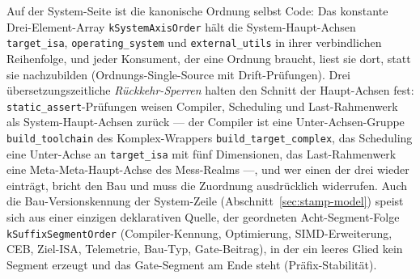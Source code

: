 \begin{nurkurz}
Auf der System-Seite ist die kanonische Ordnung selbst Code: Das konstante Drei-Element-Array
\texttt{kSystemAxisOrder} hält die System-Haupt-Achsen \texttt{target\_isa}, \texttt{operating\_system} und
\texttt{external\_utils} in ihrer verbindlichen Reihenfolge, und jeder Konsument, der eine Ordnung braucht,
liest sie dort, statt sie nachzubilden (Ordnungs-Single-Source mit Drift-Prüfungen). Drei
übersetzungszeitliche \emph{Rückkehr-Sperren} halten den Schnitt der Haupt-Achsen fest:
\texttt{static\_assert}-Prüfungen weisen Compiler, Scheduling und Last-Rahmenwerk als System-Haupt-Achsen
zurück --- der Compiler ist eine Unter-Achsen-Gruppe \texttt{build\_toolchain} des Komplex-Wrappers
\texttt{build\_target\_complex}, das Scheduling eine Unter-Achse an \texttt{target\_isa} mit fünf
Dimensionen, das Last-Rahmenwerk eine Meta-Meta-Haupt-Achse des Mess-Realms ---, und wer einen der drei
wieder einträgt, bricht den Bau und muss die Zuordnung ausdrücklich widerrufen. Auch die
Bau-Versionskennung der System-Zeile (Abschnitt~\ref{sec:stamp-model}) speist sich aus einer einzigen
deklarativen Quelle, der geordneten Acht-Segment-Folge \texttt{kSuffixSegmentOrder} (Compiler-Kennung,
Optimierung, SIMD-Erweiterung, CEB, Ziel-ISA, Telemetrie, Bau-Typ, Gate-Beitrag), in der ein leeres Glied
kein Segment erzeugt und das Gate-Segment am Ende steht (Präfix-Stabilität).
\end{nurkurz}

